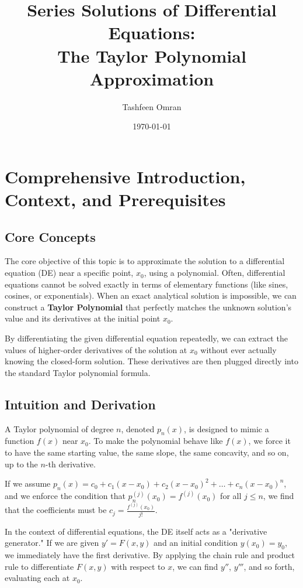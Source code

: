 \documentclass[11pt, letterpaper]{article}
\title{Series Solutions of Differential Equations: \\ The Taylor Polynomial Approximation}
\author{Tashfeen Omran}
\date{\today}
\theoremstyle{definition}
\theoremstyle{remark}
\begin{document}
\maketitle
\tableofcontents
\newpage

\section{Comprehensive Introduction, Context, and Prerequisites}

\subsection{Core Concepts}
The core objective of this topic is to approximate the solution to a differential equation (DE) near a specific point, $x_0$, using a polynomial. Often, differential equations cannot be solved exactly in terms of elementary functions (like sines, cosines, or exponentials). When an exact analytical solution is impossible, we can construct a \textbf{Taylor Polynomial} that perfectly matches the unknown solution's value and its derivatives at the initial point $x_0$. 

By differentiating the given differential equation repeatedly, we can extract the values of higher-order derivatives of the solution at $x_0$ without ever actually knowing the closed-form solution. These derivatives are then plugged directly into the standard Taylor polynomial formula.

\subsection{Intuition and Derivation}
A Taylor polynomial of degree $n$, denoted $p_n(x)$, is designed to mimic a function $f(x)$ near $x_0$. To make the polynomial behave like $f(x)$, we force it to have the same starting value, the same slope, the same concavity, and so on, up to the $n$-th derivative. 

If we assume $p_n(x) = c_0 + c_1(x-x_0) + c_2(x-x_0)^2 + \dots + c_n(x-x_0)^n$, and we enforce the condition that $p_n^{(j)}(x_0) = f^{(j)}(x_0)$ for all $j \le n$, we find that the coefficients must be $c_j = \frac{f^{(j)}(x_0)}{j!}$. 

In the context of differential equations, the DE itself acts as a "derivative generator." If we are given $y' = F(x, y)$ and an initial condition $y(x_0) = y_0$, we immediately have the first derivative. By applying the chain rule and product rule to differentiate $F(x, y)$ with respect to $x$, we can find $y''$, $y'''$, and so forth, evaluating each at $x_0$.
\end{document}
